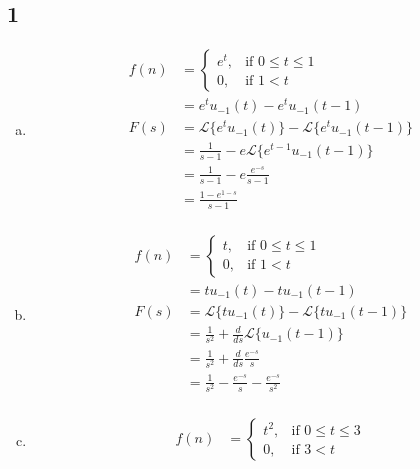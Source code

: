 \documentclass[12pt]{article}
\begin{document}
\subsection*{1}
\begin{enumerate}[a)]
    \item
        \begin{align*}
        f(n) &=
            \begin{cases}
            e^t, & \text{if }0 \leq t \leq 1 \\
            0, & \text{if }1 < t
            \end{cases}\\
            &= e^tu_{-1}(t) - e^tu_{-1}(t-1)\\
            F(s) &= \mathcal{L} \{e^tu_{-1}(t)\} - \mathcal{L}\{e^tu_{-1}(t-1)\}\\
                &= \frac{1}{s-1} - e\mathcal{L}\{e^{t-1}u_{-1}(t-1)\}\\
                &= \frac{1}{s-1} - e\frac{e^{-s}}{s-1} \\
                &= \frac{1-e^{1-s}}{s-1} \\
        \end{align*}
    \item
        \begin{align*}
            f(n) &=
                \begin{cases}
                t, & \text{if }0 \leq t \leq 1 \\
                0, & \text{if }1 < t
                \end{cases}\\
            &= tu_{-1}(t)-tu_{-1}(t-1)\\
            F(s) &= \mathcal{L}\{tu_{-1}(t)\} - \mathcal{L}\{tu_{-1}(t-1)\}\\
                &= \frac{1}{s^2} + \frac{d}{ds}\mathcal{L}\{u_{-1}(t-1)\}\\
                &= \frac{1}{s^2} + \frac{d}{ds}\frac{e^{-s}}{s} \\
                &= \frac{1}{s^2} - \frac{e^{-s}}{s} - \frac{e^{-s}}{s^2} \\
        \end{align*}
    \item
        \begin{align*}
            f(n) &=
                \begin{cases}
                t^2, & \text{if }0 \leq t \leq 3 \\
                0, & \text{if }3 < t
                \end{cases}\\

\end{align*}
\end{enumerate}
\end{document}
